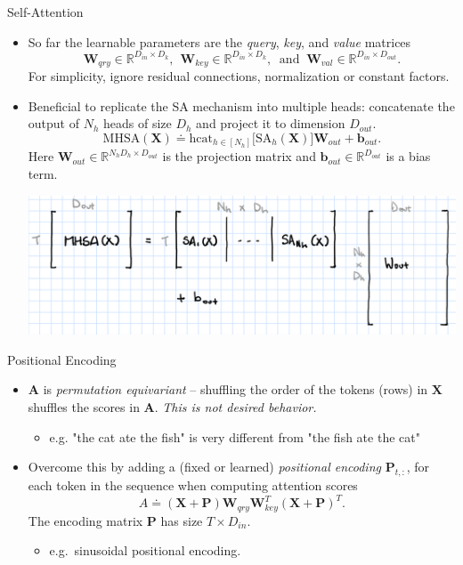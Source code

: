 \documentclass[9pt]{beamer}
\newcommand{\bb}{\mathbb}
\newcommand{\mb}{\bm}
\begin{document}
\begin{frame}{Self-Attention}
\begin{itemize}
\item So far the learnable parameters are the {\em query}, {\em key}, and {\em value} matrices
$$\mb W_{qry} \in \bb R^{D_{in}\times{D_k}}, \ \ 
\mb W_{key} \in \bb R^{D_{in}\times{D_k}},\ \text{ and } \ 
\mb W_{val} \in \bb R^{D_{in}\times{D_{out}}}.$$
For simplicity, ignore residual connections, normalization or constant factors.

\item Beneficial to replicate the SA mechanism into multiple heads: concatenate the output of $N_h$ heads of size $D_h$ and project it to dimension $D_{out}$.
\begin{equation}
\mathrm{MHSA}(\mb X) \doteq \mathrm{hcat}_{h\in[N_h]}\big[\mathrm{SA}_h(\mb X)\big]\mb W_{out} + \mb b_{out}. \label{mhsa}
\end{equation}
Here $\bm W_{out}\in\bb R^{N_hD_h\times D_{out}}$ is the projection matrix and $\bm  b_{out}\in\bb R^{D_{out}}$ is a bias term.

\begin{center}
    \includegraphics[width=.7\textwidth]{images/mhsa.png}
\end{center}
\end{itemize}
\end{frame}


\begin{frame}{Positional Encoding}
\begin{itemize}

\item $\bm A$ is {\em permutation equivariant} -- shuffling the order of the tokens (rows) in $\bm X$ shuffles the scores in $\bm A$. {\em This is not desired behavior.}
\begin{itemize}
    \item e.g. "the cat ate the fish" is very different from "the fish ate the cat"
\end{itemize}

\vspace{.1in}
\item Overcome this by adding a (fixed or learned) {\em positional encoding} $\bm P_{t,:}$, for each token in the sequence when computing attention scores
\begin{equation}
A \doteq (\mb X + \mb P)\mb W_{qry}\mb W_{key}^T (\mb X + \mb P)^T.
\end{equation}
The encoding matrix $\bm P$ has size $T\times D_{in}$.
\begin{itemize}
    \item e.g.\ sinusoidal positional encoding.
\end{itemize}
\end{itemize}
\end{frame}
\end{document}
